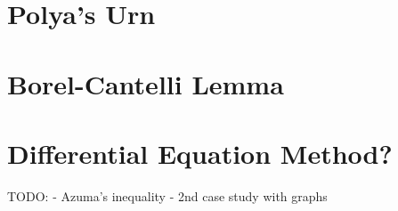 \section{Polya's Urn}
\label{stoch:polya}

\section{Borel-Cantelli Lemma}

\section{Differential Equation Method?}
TODO:
- Azuma's inequality
- 2nd case study with graphs